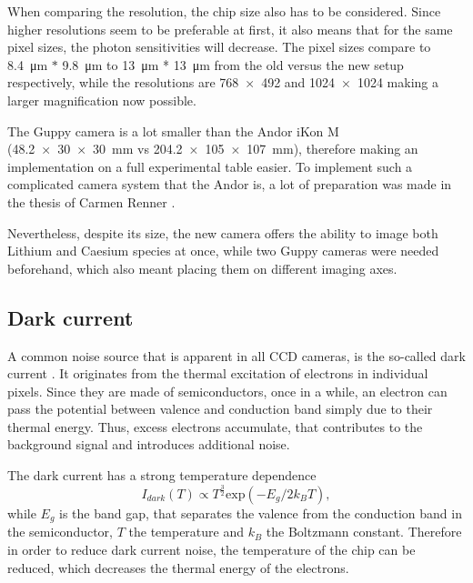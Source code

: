When comparing the resolution, the chip size also has to be considered. Since higher resolutions seem to be preferable at first, it also means that for the same pixel sizes, the photon sensitivities will decrease. The pixel sizes compare to \SI{8.4}{\micro\meter} $*$ \SI{9.8}{\micro\meter} to \SI{13}{\micro\meter} * \SI{13}{\micro\meter} from the old versus the new setup respectively, while the resolutions are \SI{768x492}{} and \SI{1024x1024}{} making a larger magnification now possible.

The Guppy camera is a lot smaller than the Andor iKon M (\SI{48.2x30x30}{\milli\meter} vs \SI{204.2x105x107}{\milli\meter}), therefore making an implementation on a full experimental table easier. To implement such a complicated camera system that the Andor is, a lot of preparation was made in the thesis of Carmen Renner \cite{Renner2014}.

Nevertheless, despite its size, the new camera offers the ability to image both Lithium and Caesium species at once, while two Guppy cameras were needed beforehand, which also meant placing them on different imaging axes.

\subsection{Dark current}
A common noise source that is apparent in all CCD cameras, is the so-called dark current \cite{Ottenstein2006} \cite{FP362011}. It originates from the thermal excitation of electrons in individual pixels. Since they are made of semiconductors, once in a while, an electron can pass the potential between valence and conduction band simply due to their thermal energy. Thus, excess electrons accumulate, that contributes to the background signal and introduces additional noise.

The dark current has a strong temperature dependence
\begin{equation}
\label{eq:darkcurrent}
I_{dark}(T) \propto T^{\frac{3}{2}} \mathrm{exp}(-E_g/2k_BT),
\end{equation}
while $E_g$ is the band gap, that separates the valence from the conduction band in the semiconductor, $T$ the temperature and $k_B$ the Boltzmann constant.
Therefore in order to reduce dark current noise, the temperature of the chip can be reduced, which decreases the thermal energy of the electrons.

